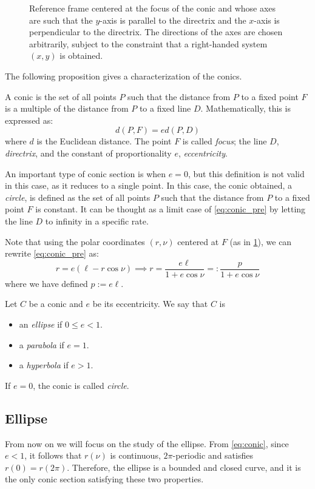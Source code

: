 \documentclass[../main.tex]{subfiles}
\begin{document}
\begin{figure}[htbp]
\begin{minipage}[ht]{0.45\textwidth}
    \caption{Reference frame centered at the focus of the conic and whose axes are such that the $y$-axis is parallel to the directrix and the $x$-axis is perpendicular to the directrix. The directions of the axes are chosen arbitrarily, subject to the constraint that a right-handed system $(x,y)$ is obtained.}
    \label{fig:conics_cartesian}
  \end{minipage}
\end{figure}
The following proposition gives a characterization of the conics.
\begin{proposition}
  A conic is the set of all points $P$ such that the distance from $P$ to a fixed point $F$ is a multiple of the distance from $P$ to a fixed line $D$. Mathematically, this is expressed as:
  \begin{equation}\label{eq:conic_pre}
    d(P,F)=e d(P,D)
  \end{equation}
  where $d$ is the Euclidean distance. The point $F$ is called \emph{focus}; the line $D$, \emph{directrix}, and the constant of proportionality $e$, \emph{eccentricity}.
\end{proposition}
An important type of conic section is when $e=0$, but this definition is not valid in this case, as it reduces to a single point. In this case, the conic obtained, a \emph{circle}, is defined as the set of all points $P$ such that the distance from $P$ to a fixed point $F$ is constant. It can be thought as a limit case of \cref{eq:conic_pre} by letting the line $D$ to infinity in a specific rate.

Note that using the polar coordinates $(r,\nu)$ centered at $F$ (as in \cref{fig:conics_cartesian}), we can rewrite \cref{eq:conic_pre} as:
\begin{equation}\label{eq:conic}
  r=e(\ell - r\cos\nu)\implies r= \frac{e\ell}{1+e\cos\nu}=:\frac{p}{1+e\cos\nu}
\end{equation}
where we have defined $p:=e\ell$.
\begin{definition}
  Let $C$ be a conic and $e$ be its eccentricity. We say that $C$ is
  \begin{itemize}
    \item an \emph{ellipse} if $0\leq e<1$.
    \item a \emph{parabola} if $e=1$.
    \item a \emph{hyperbola} if $e>1$.
  \end{itemize}
  If $e=0$, the conic is called \emph{circle}.
\end{definition}
\subsection{Ellipse}\label{sec:ellipse}
From now on we will focus on the study of the ellipse. From \cref{eq:conic}, since $e<1$, it follows that $r(\nu)$ is continuous, $2\pi$-periodic and satisfies $r(0)=r(2\pi)$. Therefore, the ellipse is a bounded and closed curve, and it is the only conic section satisfying these two properties.
\end{document}
